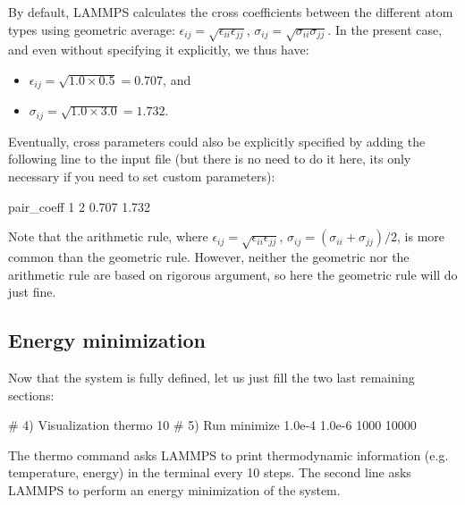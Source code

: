 \begin{tcolorbox}[colback=mylightblue!5!white,colframe=mylightblue!75!black,title=About cross parameters]
By default, LAMMPS calculates the cross coefficients between the different atom types
using geometric average: 
$\epsilon_{ij} = \sqrt{\epsilon_{ii} \epsilon_{jj}}$,
$\sigma_{ij} = \sqrt{\sigma_{ii} \sigma_{jj}}$. 
In the present case, and even without specifying it explicitly, we thus have:
\begin{itemize}
\item $\epsilon_{ij} = \sqrt{1.0 \times 0.5} = 0.707$, and 
\item $\sigma_{ij} = \sqrt{1.0 \times 3.0} = 1.732$.
\end{itemize}
Eventually, cross parameters could also be explicitly specified by adding the following 
line to the input file (but there is no need to do it here, its only necessary if you need 
to set custom parameters):
\begin{lcverbatim}

pair_coeff 1 2 0.707 1.732 
\end{lcverbatim}

\noindent Note that the arithmetic rule, where 
$\epsilon_{ij} = \sqrt{\epsilon_{ii} \epsilon_{jj}}$,
$\sigma_{ij} = (\sigma_{ii}+\sigma_{jj})/2$, 
is more common than the geometric rule. However, neither the geometric nor the
arithmetic rule are based on rigorous argument, so here
the geometric rule will do just fine. 
\end{tcolorbox}

\noindent \subsection{Energy minimization}

Now that the system is fully defined, let us just fill the two last remaining sections:

\begin{lcverbatim}
# 4) Visualization
thermo 10
# 5) Run
minimize 1.0e-4 1.0e-6 1000 10000
\end{lcverbatim}

\noindent The thermo command asks LAMMPS to print
thermodynamic information (e.g. temperature, energy) in the
terminal every 10 steps. The second line asks LAMMPS to
perform an energy minimization of the system.

